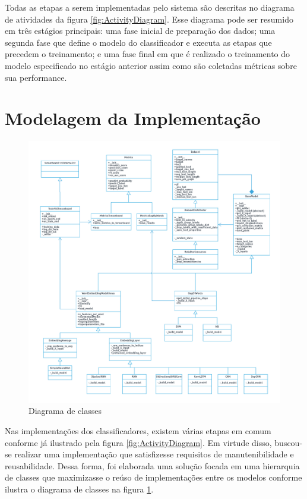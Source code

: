 Todas as etapas a serem implementadas pelo sistema são descritas no diagrama de atividades da figura \ref{fig:ActivityDiagram}. Esse diagrama pode ser resumido em três estágios principais: uma fase inicial de preparação dos dados; uma segunda fase que define o modelo do classificador e executa as etapas que precedem o treinamento;  e uma fase final em que é realizado o treinamento do modelo especificado no estágio anterior assim como são coletadas métricas sobre sua performance.

\section{Modelagem da Implementação}

\begin{figure}[!ht]
	\centering
	\includegraphics[width=1.15\textwidth]{figures/ClassDiagram.png}
	\caption{Diagrama de classes}
	\label{fig:ClassDiagram}
\end{figure}

Nas implementações dos classificadores, existem várias etapas em comum conforme já ilustrado pela figura \ref{fig:ActivityDiagram}. Em virtude disso, buscou-se realizar uma implementação que satisfizesse requisitos de manutenibilidade e reusabilidade. Dessa forma, foi elaborada uma solução focada em uma hierarquia de classes que maximizasse o reúso de implementações entre os modelos conforme ilustra o diagrama de classes na figura \ref{fig:ClassDiagram}. 

